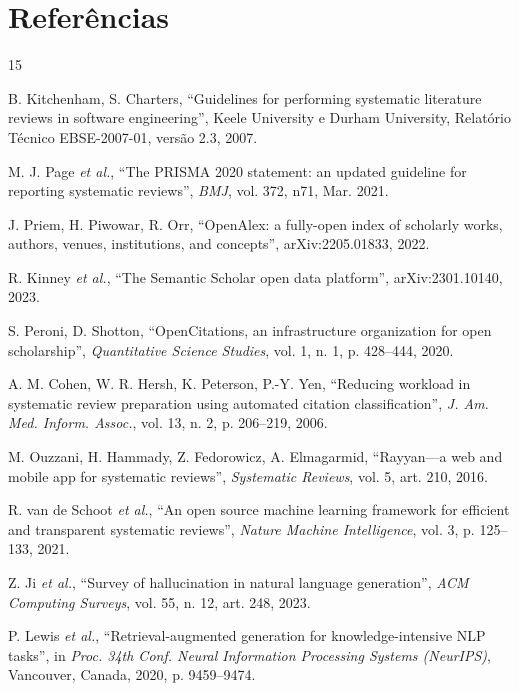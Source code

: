 \documentclass[10pt,a4paper,twocolumn]{article}
\begin{document}
\section*{Referências}
{\fontsize{8}{9.5}\selectfont
\renewcommand{\section}[2]{}%
\begin{thebibliography}{15}
\setlength{\itemsep}{1pt}

B. Kitchenham, S. Charters, ``Guidelines for performing systematic literature reviews in software engineering'', Keele University e Durham University, Relatório Técnico EBSE-2007-01, versão 2.3, 2007.

M. J. Page \emph{et al.}, ``The PRISMA 2020 statement: an updated guideline for reporting systematic reviews'', \emph{BMJ}, vol. 372, n71, Mar. 2021.

J. Priem, H. Piwowar, R. Orr, ``OpenAlex: a fully-open index of scholarly works, authors, venues, institutions, and concepts'', arXiv:2205.01833, 2022.

R. Kinney \emph{et al.}, ``The Semantic Scholar open data platform'', arXiv:2301.10140, 2023.

S. Peroni, D. Shotton, ``OpenCitations, an infrastructure organization for open scholarship'', \emph{Quantitative Science Studies}, vol. 1, n. 1, p. 428--444, 2020.

A. M. Cohen, W. R. Hersh, K. Peterson, P.-Y. Yen, ``Reducing workload in systematic review preparation using automated citation classification'', \emph{J. Am. Med. Inform. Assoc.}, vol. 13, n. 2, p. 206--219, 2006.

M. Ouzzani, H. Hammady, Z. Fedorowicz, A. Elmagarmid, ``Rayyan---a web and mobile app for systematic reviews'', \emph{Systematic Reviews}, vol. 5, art. 210, 2016.

R. van de Schoot \emph{et al.}, ``An open source machine learning framework for efficient and transparent systematic reviews'', \emph{Nature Machine Intelligence}, vol. 3, p. 125--133, 2021.

Z. Ji \emph{et al.}, ``Survey of hallucination in natural language generation'', \emph{ACM Computing Surveys}, vol. 55, n. 12, art. 248, 2023.

P. Lewis \emph{et al.}, ``Retrieval-augmented generation for knowledge-intensive NLP tasks'', in \emph{Proc. 34th Conf. Neural Information Processing Systems (NeurIPS)}, Vancouver, Canada, 2020, p. 9459--9474.


\end{thebibliography}}
\end{document}
